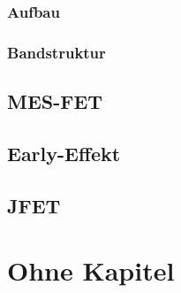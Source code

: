 \documentclass{article}
\begin{document}
    \subsubsection{Aufbau}
    \subsubsection{Bandstruktur}

\subsection{MES-FET}\label{k6:mesfet}

\subsection{Early-Effekt}\label{k6:early}

\subsection{JFET}\label{k6:jfet}

\section{Ohne Kapitel}
\end{document}
